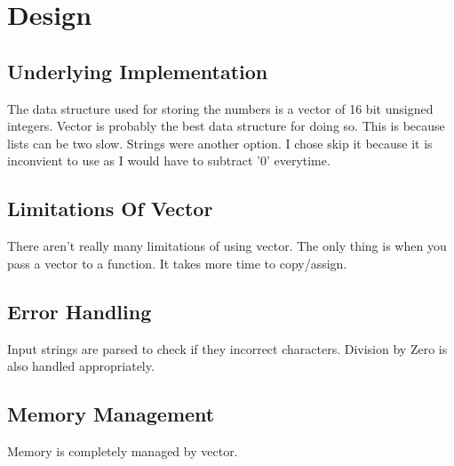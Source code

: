 \section{Design}

\subsection{Underlying Implementation}
\par 
The data structure used for storing the numbers is a vector of 16 bit unsigned integers. Vector is probably the best data structure for doing so. This is because lists can be two slow. Strings were another option. I chose skip it because it is inconvient to use as I would have to subtract '0' everytime.

\subsection{Limitations Of Vector}
\par
There aren't really many limitations of using vector. The only thing is when you pass a vector to a function. It takes more time to copy/assign.

\subsection{Error Handling}
\par
Input strings are parsed to check if they incorrect characters. Division by Zero is also handled appropriately.

\subsection{Memory Management}
\par 
Memory is completely managed by vector.

